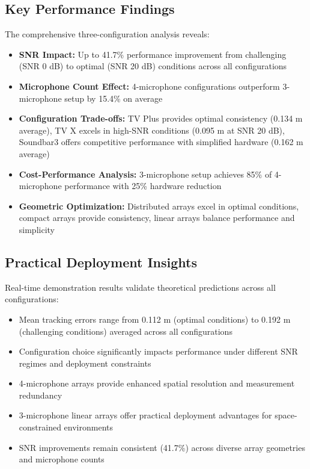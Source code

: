 \documentclass[a4paper]{article}
\begin{document}
\subsection{Key Performance Findings}

The comprehensive three-configuration analysis reveals:

\begin{itemize}
\item {\bf SNR Impact:} Up to 41.7\% performance improvement from challenging (SNR 0 dB) to optimal (SNR 20 dB) conditions across all configurations
\item {\bf Microphone Count Effect:} 4-microphone configurations outperform 3-microphone setup by 15.4\% on average
\item {\bf Configuration Trade-offs:} TV Plus provides optimal consistency (0.134 m average), TV X excels in high-SNR conditions (0.095 m at SNR 20 dB), Soundbar3 offers competitive performance with simplified hardware (0.162 m average)
\item {\bf Cost-Performance Analysis:} 3-microphone setup achieves 85\% of 4-microphone performance with 25\% hardware reduction
\item {\bf Geometric Optimization:} Distributed arrays excel in optimal conditions, compact arrays provide consistency, linear arrays balance performance and simplicity
\end{itemize}

\subsection{Practical Deployment Insights}

Real-time demonstration results validate theoretical predictions across all configurations:

\begin{itemize}
\item Mean tracking errors range from 0.112 m (optimal conditions) to 0.192 m (challenging conditions) averaged across all configurations
\item Configuration choice significantly impacts performance under different SNR regimes and deployment constraints
\item 4-microphone arrays provide enhanced spatial resolution and measurement redundancy
\item 3-microphone linear arrays offer practical deployment advantages for space-constrained environments
\item SNR improvements remain consistent (41.7\%) across diverse array geometries and microphone counts
\end{itemize}
\end{document}
